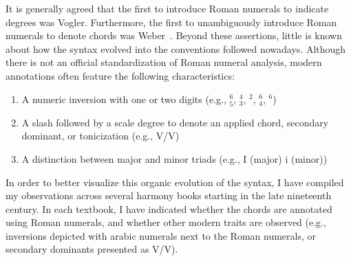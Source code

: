 It is generally agreed that the first to introduce Roman numerals to indicate degrees was Vogler.
Furthermore, the first to unambiguously introduce Roman numerals to denote chords was Weber~\parencite{weber_theory_2018}.
Beyond these assertions, little is known about how the syntax evolved into the conventions followed nowadays.
Although there is not an official standardization of Roman numeral analysis, modern annotations often feature the following characteristics:


\begin{enumerate}
    \item A numeric inversion with one or two digits (e.g., $^6_5$, $^4_3$, $^2$, $^6_4$, $^6$)
    \item A slash followed by a scale degree to denote an applied chord, secondary dominant, or tonicization (e.g., V/V)
    \item A distinction between major and minor triads (e.g., I (major) i (minor))
\end{enumerate}

In order to better visualize this organic evolution of the syntax, I have compiled my observations across several harmony books starting in the late nineteenth century.
In each textbook, I have indicated whether the chords are annotated using Roman numerals, and whether other modern traits are observed (e.g., inversions depicted with arabic numerals next to the Roman numerals, or secondary dominants presented as V/V).

